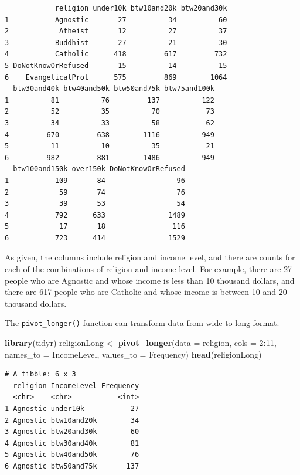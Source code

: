 \documentclass[
]{krantz}
\makeatletter
\newenvironment{Shaded}{\begin{snugshade}}{\end{snugshade}}
\newcommand{\DataTypeTok}[1]{\textcolor[rgb]{0.27,0.27,0.27}{#1}}
\newcommand{\DecValTok}[1]{\textcolor[rgb]{0.06,0.06,0.06}{#1}}
\newcommand{\KeywordTok}[1]{\textcolor[rgb]{0.27,0.27,0.27}{\textbf{#1}}}
\newcommand{\NormalTok}[1]{#1}
\newcommand{\OperatorTok}[1]{\textcolor[rgb]{0.43,0.43,0.43}{\textbf{#1}}}
\newcommand{\StringTok}[1]{\textcolor[rgb]{0.5,0.5,0.5}{#1}}
\newenvironment{kframe}{%
\medskip{}
\setlength{\fboxsep}{.8em}
 \def\at@end@of@kframe{}%
 \ifinner\ifhmode%
  \def\at@end@of@kframe{\end{minipage}}%
  \begin{minipage}{\columnwidth}%
 \fi\fi%
 \def\FrameCommand##1{\hskip\@totalleftmargin \hskip-\fboxsep
 \colorbox{shadecolor}{##1}\hskip-\fboxsep
     \hskip-\linewidth \hskip-\@totalleftmargin \hskip\columnwidth}%
 \MakeFramed {\advance\hsize-\width
   \@totalleftmargin\z@ \linewidth\hsize
   \@setminipage}}%
 {\par\unskip\endMakeFramed%
 \at@end@of@kframe}
\renewenvironment{Shaded}{\begin{kframe}}{\end{kframe}}
\makeatother
\begin{document}
\begin{verbatim}
            religion under10k btw10and20k btw20and30k
1           Agnostic       27          34          60
2            Atheist       12          27          37
3           Buddhist       27          21          30
4           Catholic      418         617         732
5 DoNotKnowOrRefused       15          14          15
6    EvangelicalProt      575         869        1064
  btw30and40k btw40and50k btw50and75k btw75and100k
1          81          76         137          122
2          52          35          70           73
3          34          33          58           62
4         670         638        1116          949
5          11          10          35           21
6         982         881        1486          949
  btw100and150k over150k DoNotKnowOrRefused
1           109       84                 96
2            59       74                 76
3            39       53                 54
4           792      633               1489
5            17       18                116
6           723      414               1529
\end{verbatim}

As given, the columns include religion and income level, and there are counts for each of the combinations of religion and income level. For example, there are 27 people who are Agnostic and whose income is less than 10 thousand dollars, and there are 617 people who are Catholic and whose income is between 10 and 20 thousand dollars.

The \texttt{pivot\_longer()} function can transform data from wide to long format.

\begin{Shaded}
\begin{Highlighting}[]
\KeywordTok{library}\NormalTok{(tidyr)}
\NormalTok{religionLong \textless{}{-}}\StringTok{ }\KeywordTok{pivot\_longer}\NormalTok{(}\DataTypeTok{data =}\NormalTok{ religion, }\DataTypeTok{cols =} \DecValTok{2}\OperatorTok{:}\DecValTok{11}\NormalTok{, }
			     \DataTypeTok{names\_to =} \StringTok{\textquotesingle{}IncomeLevel\textquotesingle{}}\NormalTok{, }\DataTypeTok{values\_to =} \StringTok{\textquotesingle{}Frequency\textquotesingle{}}\NormalTok{)}
\KeywordTok{head}\NormalTok{(religionLong)}
\end{Highlighting}
\end{Shaded}

\begin{verbatim}
# A tibble: 6 x 3
  religion IncomeLevel Frequency
  <chr>    <chr>           <int>
1 Agnostic under10k           27
2 Agnostic btw10and20k        34
3 Agnostic btw20and30k        60
4 Agnostic btw30and40k        81
5 Agnostic btw40and50k        76
6 Agnostic btw50and75k       137
\end{verbatim}
\end{document}
